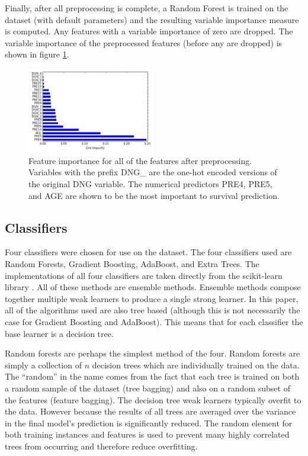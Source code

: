 \documentclass[journal]{IEEEtran}
\begin{document}
Finally, after all preprocessing is complete, a Random Forest is trained on the dataset (with default parameters) and the resulting variable importance measure is computed. Any features with a variable importance of zero are dropped. The variable importance of the preprocessed features (before any are dropped) is shown in figure \ref{fig:feature-importance}.

\begin{figure}[!t]
\centering
\includegraphics[width=0.5\textwidth]{../src/img/feature_importance.png}
\caption{Feature importance for all of the features after preprocessing. Variables with the prefix DNG\_ are the one-hot encoded versions of the original DNG variable. The numerical predictors PRE4, PRE5, and AGE are shown to be the most important to survival prediction.}
\label{fig:feature-importance}
\end{figure}

\subsection{Classifiers}
\label{subsec:classifiers}
Four classifiers were chosen for use on the dataset. The four classifiers used are Random Forests, Gradient Boosting, AdaBoost, and Extra Trees. The implementations of all four classifiers are taken directly from the scikit-learn library \cite{pedregosa2011scikit}. All of these methods are ensemble methods. Ensemble methods compose together multiple weak learners to produce a single strong learner. In this paper, all of the algorithms used are also tree based (although this is not necessarily the case for Gradient Boosting and AdaBoost). This means that for each classifier the base learner is a decision tree.

Random forests \cite{breiman2001random} are perhaps the simplest method of the four. Random forests are simply a collection of $n$ decision trees which are individually trained on the data. The ``random'' in the name comes from the fact that each tree is trained on both a random sample of the dataset (tree bagging) and also on a random subset of the features (feature bagging). The decision tree weak learners typically overfit to the data. However because the results of all trees are averaged over the variance in the final model's prediction is significantly reduced. The random element for both training instances and features is used to prevent many highly correlated trees from occurring and therefore reduce overfitting. 
\end{document}

